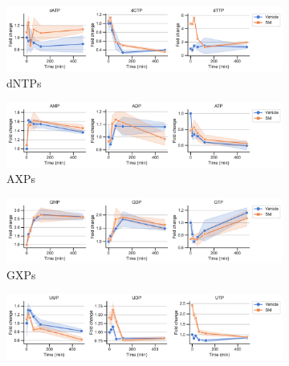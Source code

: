 \begin{figure}[!ht]
    \ContinuedFloat
    \centering
    \begin{subfigure}[b]{0.68\textwidth}
        \includegraphics[width=\textwidth]{figures/sapp/GOT_DKO_Asp_depl/HT1080_DKO_dntps.pdf}
        \caption{dNTPs}
        \label{fig:sapp:GOT_DKO_Asp_depl:HT1080_DKO_dntps}
    \end{subfigure}
    \hfill
    \begin{subfigure}[b]{0.68\textwidth}
        \includegraphics[width=\textwidth]{figures/sapp/GOT_DKO_Asp_depl/HT1080_DKO_axp.pdf}
        \caption{AXPs}
        \label{fig:sapp:GOT_DKO_Asp_depl:HT1080_DKO_axp}
    \end{subfigure}
    \hfill
    \begin{subfigure}[b]{0.68\textwidth}
        \includegraphics[width=\textwidth]{figures/sapp/GOT_DKO_Asp_depl/HT1080_DKO_gxp.pdf}
        \caption{GXPs}
        \label{fig:sapp:GOT_DKO_Asp_depl:HT1080_DKO_gxp}
    \end{subfigure}
    \hfill
    \begin{subfigure}[b]{0.68\textwidth}
        \includegraphics[width=\textwidth]{figures/sapp/GOT_DKO_Asp_depl/HT1080_DKO_uxp.pdf}

\end{subfigure}
\end{figure}
